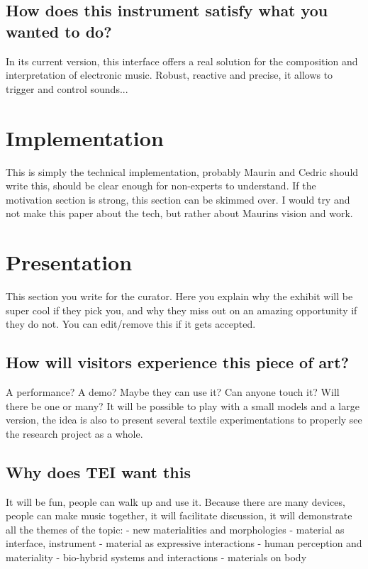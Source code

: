 \documentclass{sigchi-ext}
\begin{document}
\subsection{How does this instrument satisfy what you wanted to do?}
In its current version, this interface offers a real solution for the composition and interpretation of electronic music. Robust, reactive and precise, it allows to trigger and control sounds...


\section{Implementation}

This is simply the technical implementation, probably Maurin and Cedric should write this, should be clear enough for non-experts to understand. If the motivation section is strong, this section can be skimmed over. I would try and not make this paper about the tech, but rather about Maurins vision and work.


\section{Presentation}

This section you write for the curator. Here you explain why the exhibit will be super cool if they pick you, and why they miss out on an amazing opportunity if they do not. You can edit/remove this if it gets accepted.


\subsection{How will visitors experience this piece of art?}
A performance? A demo? Maybe they can use it? Can anyone touch it? Will there be one or many?
It will be possible to play with a small models and a large version, the idea is also to present several textile experimentations to properly see the research project as a whole.


\subsection{Why does TEI want this}
It will be fun, people can walk up and use it. Because there are many devices, people can make music together, it will facilitate discussion, it will demonstrate all the themes of the topic:
- new materialities and morphologies
- material as interface, instrument
- material as expressive interactions
- human perception and materiality
- bio-hybrid systems and interactions
- materials on body
\end{document}
